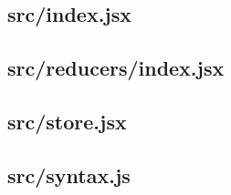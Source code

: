 \subsection{src/index.jsx}
\label{app:client_src_index_jsx}

\subsection{src/reducers/index.jsx}
\label{app:client_src_reducers_index_jsx}

\subsection{src/store.jsx}
\label{app:client_src_store_jsx}

\subsection{src/syntax.js}
\label{app:client_src_syntax_js}

